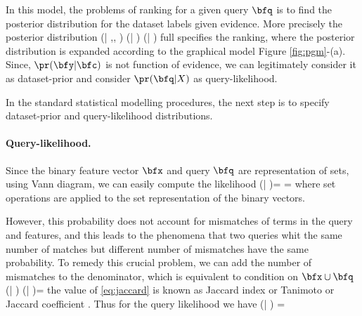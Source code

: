 \documentclass{amia}
\begin{document}
In this model, the problems of ranking for a given query $\bfq$ is to find the posterior distribution for the dataset labels given evidence. More precisely the posterior distribution
\beq
\pr(\bfy | \bfq,\bfc, \bfx) \propto \pr(\bfy | \bfc ) \pr(\bfq | \bfx)
\eeq
full specifies the ranking, where the posterior distribution is expanded according to the graphical model Figure \ref{fig:pgm}-(a). 
Since, $\pr(\bfy | \bfc )$  is not function of evidence, we can legitimately consider it as dataset-prior and consider $\pr(\bfq | X)$ as query-likelihood.

In the standard statistical modelling procedures, the next step is to specify dataset-prior and query-likelihood distributions.

\paragraph{Query-likelihood.} Since the binary feature vector $\bfx$ and query $\bfq$ are representation of sets, using Vann diagram, we can easily compute the likelihood
\beq
\pr(\bfq | \bfx)= \frac{\pr(\bfq , \bfx)}{\pr(\bfx)} = \frac{|\bfq \cap \bfx|}{|\bfx|}
\eeq
where set operations are applied to the set representation of the binary vectors.

However, this probability does not account for mismatches of terms in the query and features, and this leads to the phenomena that two queries whit the same number of matches but different number of mismatches have the same probability. To remedy this crucial problem, we can add the number of mismatches to the denominator, which is equivalent to condition on $\bfx \cup \bfq$
\beq \label{eq:jaccard}
\widehat{\pr}(\bfq | \bfx ) \propto \pr(\bfq | \bfx \cup \bfq)= \frac{|\bfq \cap \bfx|}{|\bfq \cup \bfx|}
\eeq
the value of \eqref{eq:jaccard} is known as Jaccard index or Tanimoto or Jaccard coefficient \cite{book:IR}. Thus for the query likelihood we have
\beq \label{eq:jaccard}
\widehat{\pr}(\bfq | \bfx ) = 
\eeq
\end{document}
